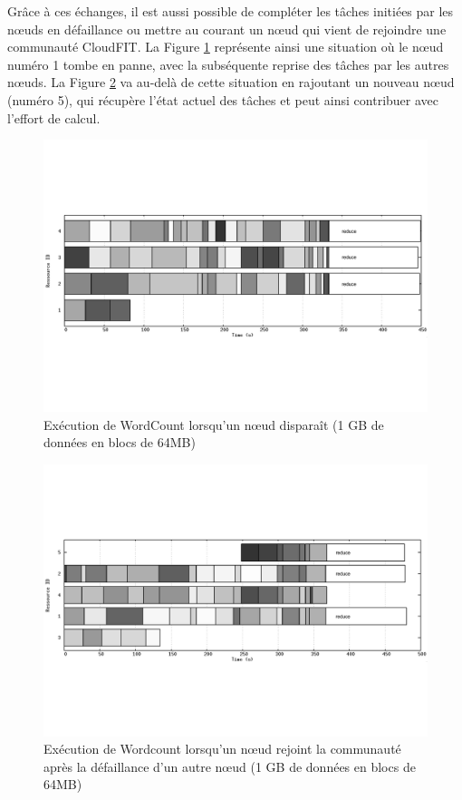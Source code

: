 Grâce à ces échanges, il est aussi possible de compléter les tâches initiées par les n{\oe}uds en défaillance ou mettre au courant un n{\oe}ud qui vient de rejoindre une communauté CloudFIT. La Figure \ref{fig:1out} représente ainsi une situation où le n{\oe}ud numéro 1 tombe en panne, avec la subséquente reprise des tâches par les autres n{\oe}uds. La Figure \ref{fig:reprise} va au-delà de cette situation en rajoutant un nouveau n{\oe}ud (numéro 5), qui récupère l'état actuel des tâches et peut ainsi contribuer avec l'effort de calcul.
\begin{figure}
	\centering
		\includegraphics[width=1\linewidth]{img/1out2}
		\caption{Exécution de WordCount lorsqu'un n{\oe}ud disparaît (1 GB de données en blocs de 64MB)}\label{fig:1out}
\end{figure}

\begin{figure}
	\centering
		\includegraphics[width=1\linewidth]{img/reprise2}
		\caption{Exécution de Wordcount lorsqu'un n{\oe}ud rejoint la communauté après la défaillance d'un autre n{\oe}ud (1 GB de données en blocs de 64MB)}\label{fig:reprise}
\end{figure}


